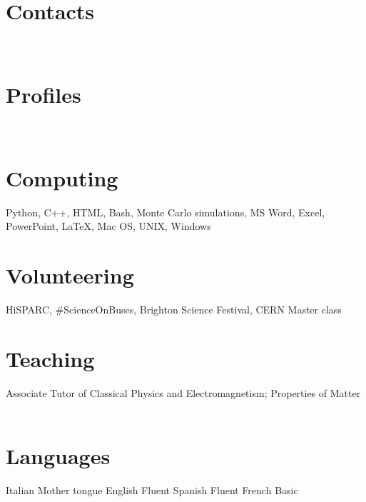 \documentclass[print]{cv} %
\newcommand{\profilepic}[1]{\renewcommand{\profilepic}{#1}}
\newlength\imagewidth
\newlength\imagescale
\begin{document}


\begin{aside} %
  \section{Contacts}
    \cvmail
    \cvnumberphone
    \cvaddress
  ~
  \section{Profiles}
    \cvlinkedin
    \cvsussex
    \cvgit
    \cvsite
  ~
  \section{Computing} 
      Python, C++, HTML, 
      Bash, Monte Carlo simulations, 
      MS Word, Excel, PowerPoint,
      \LaTeX, Mac OS, UNIX, Windows
  ~
  \section{Volunteering}
    HiSPARC, 
    \#ScienceOnBuses,
    Brighton Science Festival,
    CERN Master class
  ~
  \section{Teaching}
    Associate Tutor of Classical Physics and Electromagnetism; Properties of Matter
  ~
  \section{Languages}
    Italian Mother tongue
    English Fluent
    Spanish Fluent
    French Basic
  ~
\end{aside}
\end{document}
